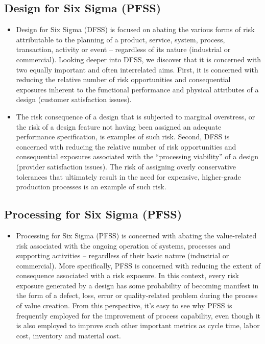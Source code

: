 \documentclass[11pt]{article} %
\begin{document}
\subsection{Design for Six Sigma (PFSS)}
\begin{itemize}
\item Design for Six Sigma (DFSS) is focused on abating the various forms of risk attributable to the planning of a product, service, system, process, transaction, activity or event – regardless of its nature (industrial or commercial). Looking deeper into DFSS, we discover that it is concerned with two equally important and often interrelated aims.  First, it is concerned with reducing the relative number of risk opportunities and consequential exposures inherent to the functional performance and physical attributes of a design (customer satisfaction issues).  


\item The risk consequence of a design that is subjected to marginal overstress, or the risk of a design feature not having been assigned an adequate performance specification, is examples of such risk.  Second, DFSS is concerned with reducing the relative number of risk opportunities and consequential exposures associated with the “processing viability” of a design (provider satisfaction issues).  The risk of assigning overly conservative tolerances that ultimately result in the need for expensive, higher-grade production processes is an example of such risk.
\end{itemize}

\subsection{Processing for Six Sigma (PFSS)}
\begin{itemize}
\item Processing for Six Sigma (PFSS) is concerned with abating the value-related risk associated with the ongoing operation of systems, processes and supporting activities – regardless of their basic nature (industrial or commercial).  More specifically, PFSS is concerned with reducing the extent of consequence associated with a risk exposure.  In this context, every risk exposure generated by a design has some probability of becoming manifest in the form of a defect, loss, error or quality-related problem during the process of value creation.  From this perspective, it’s easy to see why PFSS is frequently employed for the improvement of process capability, even though it is also employed to improve such other important metrics as cycle time, labor cost, inventory and material cost.
\end{itemize}
\end{document}
